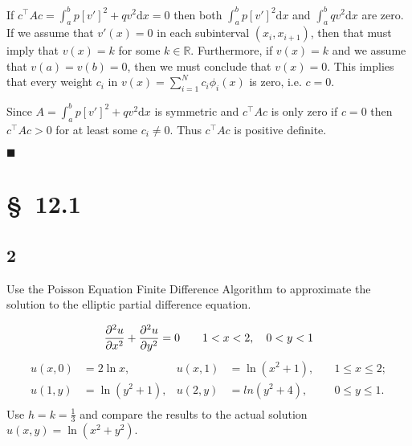 \documentclass[12pt]{article}
\newcommand{\dd}[1]{\mathrm{d}{#1}}
\begin{document}
\hfill

If $c^\intercal Ac = \int_a^bp[v']^2+qv^2\dd{x} = 0$ then both
$\int_a^bp[v']^2\dd{x}$ and $\int_a^bqv^2\dd{x}$ are zero. If we
assume that $v'(x)=0$ in each subinterval $(x_i,x_{i+1})$, then that
must imply that $v(x)=k$ for some $k \in \mathbb{R}$. Furthermore, if
$v(x)=k$ and we assume that $v(a) = v(b) = 0$, then we must conclude
that $v(x) = 0$. This implies that every weight $c_i$ in
$v(x)=\sum_{i=1}^Nc_i\phi_i(x)$ is zero, i.e. $c=0$.

Since $A=\int_a^bp[v']^2+qv^2\dd{x}$ is symmetric and $c^\intercal Ac$
is only zero if $c=0$ then $c^\intercal Ac>0$ for at least some
$c_i\neq0$. Thus $c^\intercal Ac$ is positive definite.

\hfill $\blacksquare$

\section{\S~12.1}
\subsection{2}
Use the Poisson Equation Finite Difference Algorithm to approximate
the solution to the elliptic partial difference equation.

\begin{equation*}
  \frac{\partial^2 u}{\partial x^2}+\frac{\partial^2 u}{\partial
    y^2}=0 \qquad 1<x<2,\quad 0<y<1 \\
\end{equation*}
\begin{equation*}
  \begin{aligned}
    u(x,0)&=2\ln x, &u(x,1)&=\ln(x^2+1),\quad &1\leq x\leq 2; \\
    u(1,y)&=\ln(y^2+1), &u(2,y)&=ln(y^2+4),\quad &0\leq y \leq 1. \\
  \end{aligned}
\end{equation*}
Use $h=k=\frac{1}{3}$ and compare the results to the actual solution
$u(x,y)=\ln(x^2+y^2)$.

\hfill
\end{document}
